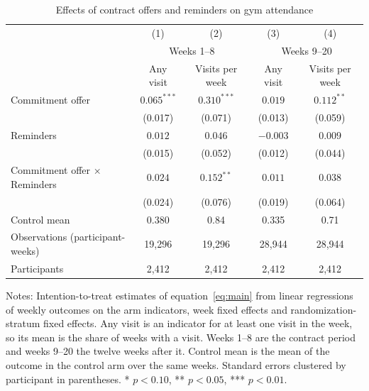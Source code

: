 \begin{table}[t]
\centering
\small
\begin{threeparttable}
\caption{Effects of contract offers and reminders on gym attendance}
\label{tab:main}
\begin{tabular}{@{}p{5.7cm}cccc@{}}
\toprule
 & (1) & (2) & (3) & (4) \\
 & \multicolumn{2}{c}{Weeks 1--8} & \multicolumn{2}{c}{Weeks 9--20} \\
 & Any visit & Visits per week & Any visit & Visits per week \\
\midrule
Commitment offer & $0.065^{***}$ & $0.310^{***}$ & $0.019$ & $0.112^{**}$ \\
 & (0.017) & (0.071) & (0.013) & (0.059) \\
Reminders & $0.012$ & $0.046$ & $-0.003$ & $0.009$ \\
 & (0.015) & (0.052) & (0.012) & (0.044) \\
Commitment offer × Reminders & $0.024$ & $0.152^{**}$ & $0.011$ & $0.038$ \\
 & (0.024) & (0.076) & (0.019) & (0.064) \\
\midrule
Control mean & 0.380 & 0.84 & 0.335 & 0.71 \\
Observations (participant-weeks) & 19,296 & 19,296 & 28,944 & 28,944 \\
Participants & 2,412 & 2,412 & 2,412 & 2,412 \\
\bottomrule
\end{tabular}
\begin{tablenotes}
\small
\item[] Notes: Intention-to-treat estimates of equation~\eqref{eq:main} from linear regressions of weekly outcomes on the arm indicators, week fixed effects and randomization-stratum fixed effects. Any visit is an indicator for at least one visit in the week, so its mean is the share of weeks with a visit. Weeks 1--8 are the contract period and weeks 9--20 the twelve weeks after it. Control mean is the mean of the outcome in the control arm over the same weeks. Standard errors clustered by participant in parentheses. * $p<0.10$, ** $p<0.05$, *** $p<0.01$.
\end{tablenotes}
\end{threeparttable}
\end{table}
